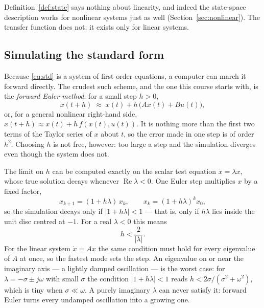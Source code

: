 \documentclass[11pt]{article}
\begin{document}
\begin{remark}\label{rem:nonlinear}
Definition~\ref{def:state} says nothing about linearity, and indeed the
state-space description works for nonlinear systems just as well
(Section~\ref{sec:nonlinear}). The transfer function does not: it exists only for
linear systems.
\end{remark}

\subsection{Simulating the standard form}
Because \eqref{eq:std} is a system of first-order equations, a computer can march
it forward directly. The crudest such scheme, and the one this course starts
with, is the \emph{forward Euler method}: for a small step $h>0$,
\begin{equation}\label{eq:euler}
   x(t+h) \;\approx\; x(t) + h\,\bigl(Ax(t)+Bu(t)\bigr),
\end{equation}
or, for a general nonlinear right-hand side, $x(t+h)\approx x(t)+h\,f(x(t),u(t))$.
It is nothing more than the first two terms of the Taylor series of $x$ about $t$,
so the error made in one step is of order $h^{2}$. Choosing $h$ is not free,
however: too large a step and the simulation diverges even though the system does
not.

\begin{remark}\label{rem:eulerstab}
The limit on $h$ can be computed exactly on the scalar test equation
$\dot x=\lambda x$, whose true solution decays whenever $\operatorname{Re}\lambda<0$.
One Euler step multiplies $x$ by a fixed factor,
\[
   x_{k+1} = (1+h\lambda)\,x_k ,\qquad x_k = (1+h\lambda)^{k}x_0 ,
\]
so the simulation decays only if $|1+h\lambda|<1$ --- that is, only if $h\lambda$
lies inside the unit disc centred at $-1$. For a real $\lambda<0$ this means
\[
   h < \frac{2}{|\lambda|} .
\]
For the linear system $\dot x=Ax$ the same condition must hold for every
eigenvalue of $A$ at once, so the fastest mode sets the step. An eigenvalue on or
near the imaginary axis --- a lightly damped oscillation --- is the worst case: for
$\lambda=-\sigma\pm j\omega$ with small $\sigma$ the condition $|1+h\lambda|<1$
reads $h<2\sigma/(\sigma^{2}+\omega^{2})$, which is tiny when $\sigma\ll\omega$. A
purely imaginary $\lambda$ can never satisfy it: forward Euler turns every
undamped oscillation into a growing one.
\end{remark}

\end{document}
